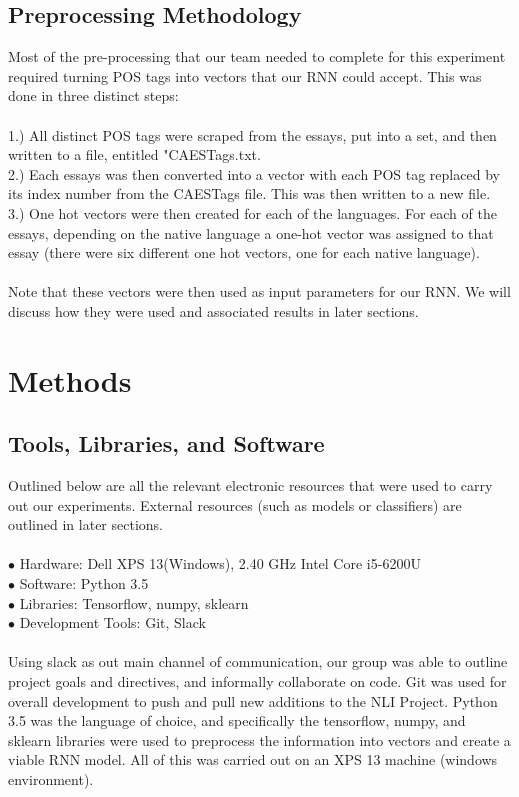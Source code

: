 \documentclass[12pt]{article}
\newcommand\tab[1][1cm]{\hspace*{#1}}
\begin{document}
 \subsection{Preprocessing Methodology}
 \tab Most of the pre-processing that our team needed to complete for this experiment required turning POS tags into vectors that our RNN could accept. This was done in three distinct steps:\\
 \\
 1.) All distinct POS tags were scraped from the essays, put into a set, and then written to a file, entitled "CAESTags.txt.\\
 2.) Each essays was then converted into a vector with each POS tag replaced by its index number from the CAESTags file. This was then written to a new file.\\
 3.) One hot vectors were then created for each of the languages. For each of the essays, depending on the native language a  one-hot vector was assigned to that essay (there were six different one hot vectors, one for each native language).\\
 \\
 Note that these vectors were then used as input parameters for our RNN. We will discuss how they were used and associated results in later sections.
 \section{Methods}
 \subsection{Tools, Libraries, and Software}
 Outlined below are all the relevant electronic resources that were used to carry out our experiments. External resources (such as models or classifiers) are outlined in later sections.\\
 \\
 $\bullet$ Hardware: Dell XPS 13(Windows), 2.40 GHz Intel Core i5-6200U\\
$\bullet$ Software: Python 3.5\\
$\bullet$ Libraries: Tensorflow, numpy, sklearn\\
$\bullet$ Development Tools: Git, Slack\\
\\
Using slack as out main channel of communication, our group was able to outline project goals and directives, and informally collaborate on code. Git was used for overall development to push and pull new additions to the NLI Project. Python 3.5 was the language of choice, and specifically the tensorflow, numpy, and sklearn libraries were used to preprocess the information into vectors and create a viable RNN model. All of this was carried out on an XPS 13 machine (windows environment).
\end{document}
